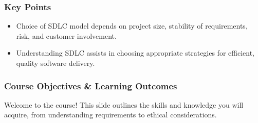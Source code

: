 \documentclass{beamer}
\begin{document}
\begin{frame}[fragile]
  \frametitle{Key Points}
  \begin{itemize}
    \item Choice of SDLC model depends on project size, stability of requirements, risk, and customer involvement.
    \item Understanding SDLC assists in choosing appropriate strategies for efficient, quality software delivery.
  \end{itemize}
\end{frame}

\begin{frame}[fragile]
    \frametitle{Course Objectives \& Learning Outcomes}
    Welcome to the course! This slide outlines the skills and knowledge you will acquire, from understanding requirements to ethical considerations.
\end{frame}
\end{document}
